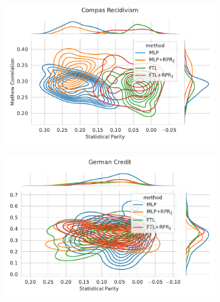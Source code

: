 \begin{figure}
\begin{subfigure}{.45\linewidth}
    \includegraphics[width=1\linewidth]{images/pareto_mcc_parity_compas_rpr.pdf}
\end{subfigure}
\begin{subfigure}{.45\linewidth}
    \includegraphics[width=1\linewidth]{images/pareto_mcc_parity_german_rpr.pdf}
\end{subfigure}
\end{figure}

